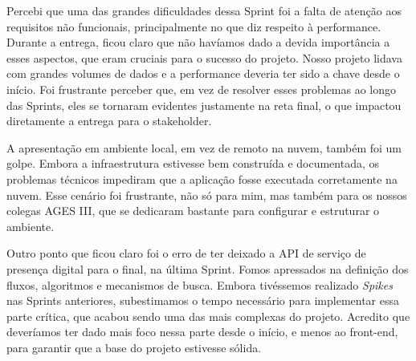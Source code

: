 \begin{reflection}
\indent \originaltab{}Percebi que uma das grandes dificuldades dessa Sprint foi a falta de atenção aos requisitos não funcionais, principalmente no que diz respeito à performance. Durante a entrega, ficou claro que não havíamos dado a devida importância a esses aspectos, que eram cruciais para o sucesso do projeto. Nosso projeto lidava com grandes volumes de dados e a performance deveria ter sido a chave desde o início. Foi frustrante perceber que, em vez de resolver esses problemas ao longo das Sprints, eles se tornaram evidentes justamente na reta final, o que impactou diretamente a entrega para o stakeholder.\par

\indent \originaltab{}A apresentação em ambiente local, em vez de remoto na nuvem, também foi um golpe. Embora a infraestrutura estivesse bem construída e documentada, os problemas técnicos impediram que a aplicação fosse executada corretamente na nuvem. Esse cenário foi frustrante, não só para mim, mas também para os nossos colegas AGES III, que se dedicaram bastante para configurar e estruturar o ambiente.\par

\indent \originaltab{}Outro ponto que ficou claro foi o erro de ter deixado a API de serviço de presença digital para o final, na última Sprint. Fomos apressados na definição dos fluxos, algoritmos e mecanismos de busca. Embora tivéssemos realizado \textit{Spikes} nas Sprints anteriores, subestimamos o tempo necessário para implementar essa parte crítica, que acabou sendo uma das mais complexas do projeto. Acredito que deveríamos ter dado mais foco nessa parte desde o início, e menos ao front-end, para garantir que a base do projeto estivesse sólida.\par

\end{reflection}
